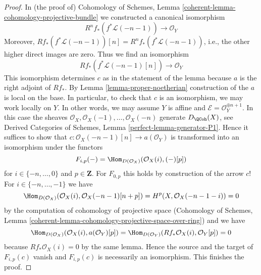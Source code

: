 \begin{proof}
In (the proof of) Cohomology of Schemes, Lemma
\ref{coherent-lemma-cohomology-projective-bundle}
we constructed a canonical isomorphism
$$
R^nf_*(f^*\mathcal{L}(-n - 1)) \longrightarrow \mathcal{O}_Y
$$
Moreover, $Rf_*(f^*\mathcal{L}(-n - 1))[n] = R^nf_*(f^*\mathcal{L}(-n - 1))$,
i.e., the other higher direct images are zero. Thus we find an isomorphism
$$
Rf_*(f^*\mathcal{L}(-n - 1)[n]) \longrightarrow \mathcal{O}_Y
$$
This isomorphism determines $c$ as in the statement of the lemma
because $a$ is the right adjoint of $Rf_*$.
By Lemma \ref{lemma-proper-noetherian} construction of the $a$
is local on the base. In particular, to check that
$c$ is an isomorphism, we may work locally on $Y$.
In other words, we may assume $Y$ is affine and
$\mathcal{E} = \mathcal{O}_Y^{\oplus n + 1}$.
In this case the sheaves $\mathcal{O}_X, \mathcal{O}_X(-1), \ldots,
\mathcal{O}_X(-n)$ generate $D_\QCoh(X)$, see
Derived Categories of Schemes, Lemma \ref{perfect-lemma-generator-P1}.
Hence it suffices to show that
$c : \mathcal{O}_X(-n - 1)[n] \to a(\mathcal{O}_Y)$
is transformed into an isomorphism under the functors
$$
F_{i, p}(-) = \Hom_{D(\mathcal{O}_X)}(\mathcal{O}_X(i), (-)[p])
$$
for $i \in \{-n, \ldots, 0\}$ and $p \in \mathbf{Z}$.
For $F_{0, p}$ this holds by construction of the arrow $c$!
For $i \in \{-n, \ldots, -1\}$ we have
$$
\Hom_{D(\mathcal{O}_X)}(\mathcal{O}_X(i), \mathcal{O}_X(-n - 1)[n + p]) =
H^p(X, \mathcal{O}_X(-n - 1 - i)) = 0
$$
by the computation of cohomology of projective space
(Cohomology of Schemes, Lemma
\ref{coherent-lemma-cohomology-projective-space-over-ring})
and we have
$$
\Hom_{D(\mathcal{O}_X)}(\mathcal{O}_X(i), a(\mathcal{O}_Y)[p]) =
\Hom_{D(\mathcal{O}_Y)}(Rf_*\mathcal{O}_X(i), \mathcal{O}_Y[p]) = 0
$$
because $Rf_*\mathcal{O}_X(i) = 0$ by the same lemma.
Hence the source and the target of $F_{i, p}(c)$ vanish
and $F_{i, p}(c)$ is necessarily an isomorphism.
This finishes the proof.
\end{proof}

